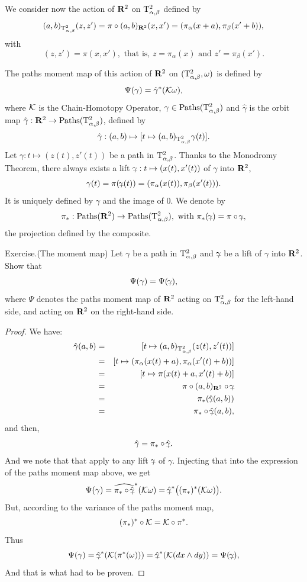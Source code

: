 We consider now the action of $\mathbf{R}^2$ on $\mathrm{T}^2_{\alpha,\beta}$ defined by
$$%
  (a,b)_{\Torus^2_{\alpha,\beta}}(z,z') = \pi \circ (a,b)_{\RR^2}(x,x') = (\pi_\alpha(x+a),\pi_\beta(x'+b)),
  $$%
with
$$%
  (z,z')=\pi(x,x'), \mbox{ that is, } z=\pi_\alpha(x) \mbox{ and } z'=\pi_\beta(x').
  $$%

The paths moment map of this action of $\mathbf{R}^2$ on $(\mathrm{T}^2_{\alpha,\beta},\omega)$ is defined by
$$%
  \Psi(\gamma) = \hat\gamma^*(\cK\omega),
  $$%
where $\mathcal{K}$ is the Chain-Homotopy Operator,
$\gamma \in \operatorname{Paths}(\mathrm{T}^2_{\alpha,\beta})$ and $\hat\gamma$ is the orbit map $\hat\gamma : \mathbf{R}^2 \to \operatorname{Paths}(\mathrm{T}^2_{\alpha,\beta})$,
defined by
$$%
  \hat\gamma : (a,b) \mapsto [t \mapsto (a,b)_{\Torus^2_{\alpha,\beta}}\gamma(t)].
  $$%
Let $\gamma : t \mapsto (z(t),z'(t))$ be a path in $\mathrm{T}^2_{\alpha,\beta}$.
Thanks to the Monodromy Theorem, there always exists a lift $\bargamma : t \mapsto (x(t),x'(t))$ of $\gamma$ into $\mathbf{R}^2$,
$$%
  \gamma(t) = \pi(\bargamma(t)) = (\pi_\alpha(x(t)),\pi_\beta(x'(t))).
  $$%
It is uniquely defined by $\gamma$ and the image of $0$.
We denote by
$$%
  \pi_* : \Paths(\RR^2) \to \Paths(\Torus^2_{\alpha,\beta}), \mbox{ with } \pi_*(\bargamma) = \pi\circ\bargamma,
  $$%
the projection defined by the composite.

\begin{Article}{Exercise.}{}{\upshape(The moment map)}
  Let $\gamma$ be a path in $\mathrm{T}^2_{\alpha,\beta}$ and $\bargamma$ be a lift of $\gamma$ into $\mathbf{R}^2$.
  Show that
  $$%
    \Psi(\gamma) = \Psi(\bargamma),
    $$%
  where $\Psi$ denotes the paths moment map of $\mathbf{R}^2$ acting on $\mathrm{T}^2_{\alpha,\beta}$ for the left-hand side,
  and acting on $\mathbf{R}^2$ on the right-hand side.
\end{Article}

\begin{proof}
  We have:
  \begin{eqnarray*}
    \hat\gamma(a,b) & = & [t \mapsto (a,b)_{\Torus^2_{\alpha,\beta}}(z(t),z'(t))] \\
    & = & [t \mapsto (\pi_\alpha(x(t)+a),\pi_\alpha(x'(t)+b))] \\
    & = & [t \mapsto \pi(x(t)+a,x'(t)+b)]\\
    & = & \pi \circ (a,b)_{\RR^2} \circ \bargamma\\
    & = & \pi_*(\hat\bargamma(a,b)) \\
    & = & \pi_* \circ \hat \bargamma(a,b),
  \end{eqnarray*}
  and then,
  $$%
    \hat\gamma = \pi_* \circ \hat \bargamma.
    $$%
  And we note that that apply to any lift $\bargamma$ of $\gamma$.
  Injecting that into the expression of the paths moment map above, we get
  $$%
    \Psi(\gamma) = \widehat{\pi_* \circ \hat\bargamma}^*(\cK\omega) = \hat\bargamma^* \big( (\pi_*)^*(\cK\omega)\big).
    $$%
  But,
  according to the variance of the paths moment map,
  $$%
    (\pi_*)^* \circ \cK = \cK \circ \pi^*.
    $$%
  Thus
  $$%
    \Psi(\gamma) = \hat\bargamma^*(\cK(\pi^*(\omega))) = \hat\bargamma^*(\cK(dx \wedge dy)) = \Psi(\bargamma),
    $$%
  And that is what had to be proven.
\end{proof}

